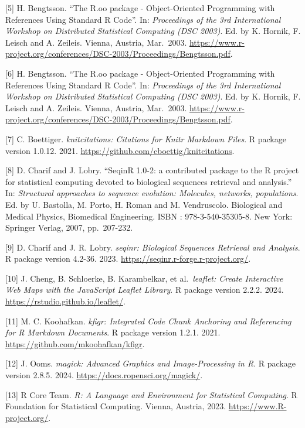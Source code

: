 \documentclass[
  12pt,
]{article}
\begin{document}
{[}5{]} H. Bengtsson. ``The R.oo package - Object-Oriented Programming with
References Using Standard R Code''. In: \emph{Proceedings of the 3rd
International Workshop on Distributed Statistical Computing (DSC
2003)}. Ed. by K. Hornik, F. Leisch and A. Zeileis. Vienna, Austria,
Mar.~2003.
\url{https://www.r-project.org/conferences/DSC-2003/Proceedings/Bengtsson.pdf}.

{[}6{]} H. Bengtsson. ``The R.oo package - Object-Oriented Programming with
References Using Standard R Code''. In: \emph{Proceedings of the 3rd
International Workshop on Distributed Statistical Computing (DSC
2003)}. Ed. by K. Hornik, F. Leisch and A. Zeileis. Vienna, Austria,
Mar.~2003.
\url{https://www.r-project.org/conferences/DSC-2003/Proceedings/Bengtsson.pdf}.

{[}7{]} C. Boettiger. \emph{knitcitations: Citations for Knitr Markdown Files}.
R package version 1.0.12. 2021.
\url{https://github.com/cboettig/knitcitations}.

{[}8{]} D. Charif and J. Lobry. ``SeqinR 1.0-2: a contributed package to the
R project for statistical computing devoted to biological sequences
retrieval and analysis.'' In: \emph{Structural approaches to sequence
evolution: Molecules, networks, populations}. Ed. by U. Bastolla, M.
Porto, H. Roman and M. Vendruscolo. Biological and Medical Physics,
Biomedical Engineering. ISBN : 978-3-540-35305-8. New York: Springer
Verlag, 2007, pp.~207-232.

{[}9{]} D. Charif and J. R. Lobry. \emph{seqinr: Biological Sequences Retrieval
and Analysis}. R package version 4.2-36. 2023.
\url{https://seqinr.r-forge.r-project.org/}.

{[}10{]} J. Cheng, B. Schloerke, B. Karambelkar, et al.~\emph{leaflet: Create
Interactive Web Maps with the JavaScript Leaflet Library}. R package
version 2.2.2. 2024. \url{https://rstudio.github.io/leaflet/}.

{[}11{]} M. C. Koohafkan. \emph{kfigr: Integrated Code Chunk Anchoring and
Referencing for R Markdown Documents}. R package version 1.2.1. 2021.
\url{https://github.com/mkoohafkan/kfigr}.

{[}12{]} J. Ooms. \emph{magick: Advanced Graphics and Image-Processing in R}. R
package version 2.8.5. 2024. \url{https://docs.ropensci.org/magick/}.

{[}13{]} R Core Team. \emph{R: A Language and Environment for Statistical
Computing}. R Foundation for Statistical Computing. Vienna, Austria,
2023. \url{https://www.R-project.org/}.
\end{document}
